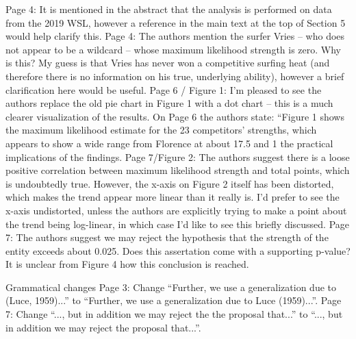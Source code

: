 \documentclass[12pt]{article}
\begin{document}
Page 4: It is mentioned in the abstract that the analysis is performed on data from the 2019 WSL,
however a reference in the main text at the top of Section 5 would help clarify this.
Page 4: The authors mention the surfer Vries – who does not appear to be a wildcard – whose
maximum likelihood strength is zero. Why is this? My guess is that Vries has never won a competitive
surfing heat (and therefore there is no information on his true, underlying ability), however a brief
clarification here would be useful.
Page 6 / Figure 1: I’m pleased to see the authors replace the old pie chart in Figure 1 with a dot chart
– this is a much clearer visualization of the results. On Page 6 the authors state: “Figure 1 shows the
maximum likelihood estimate for the 23 competitors’ strengths, which appears to show a wide range
from Florence at about 17.5%
and 1%
the practical implications of the findings.
Page 7/Figure 2: The authors suggest there is a loose positive correlation between maximum likelihood
strength and total points, which is undoubtedly true. However, the x-axis on Figure 2 itself has been
distorted, which makes the trend appear more linear than it really is. I’d prefer to see the x-axis
undistorted, unless the authors are explicitly trying to make a point about the trend being log-linear,
in which case I’d like to see this briefly discussed.
Page 7: The authors suggest we may reject the hypothesis that the strength of the entity exceeds
about 0.025. Does this assertation come with a supporting p-value? It is unclear from Figure 4 how
this conclusion is reached.

Grammatical changes
Page 3: Change “Further, we use a generalization due to (Luce, 1959)...” to “Further, we use a
generalization due to Luce (1959)...”.
Page 7: Change “..., but in addition we may reject the the proposal that...” to “..., but in addition we
may reject the proposal that...”.
\end{document}
